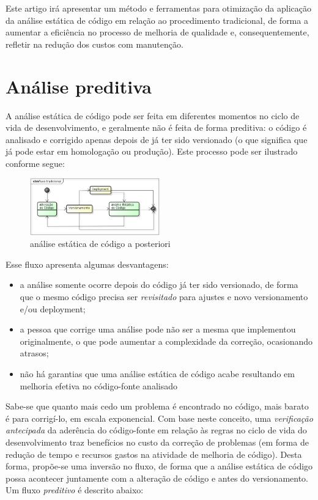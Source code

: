 \documentclass[12pt,journal,compsoc]{IEEEtran}
\begin{document}
Este artigo irá apresentar um método e ferramentas para otimização da aplicação da análise estática de código em relação ao procedimento tradicional, de forma a aumentar a eficiência no processo de melhoria de qualidade e, consequentemente, refletir na redução dos custos com manutenção.


\section{Análise preditiva}

A análise estática de código pode ser feita em diferentes momentos no ciclo de vida de desenvolvimento, e geralmente não é feita de forma preditiva: o código é analisado e corrigido apenas depois de já ter sido versionado (o que significa que já pode estar em homologação ou produção). Este processo pode ser ilustrado conforme segue:

\begin{figure}[ht!]
\centering
\includegraphics[width=0.5\textwidth]{img/flow_before}
\caption{análise estática de código a posteriori}
\label{flow_before}
\end{figure}

Esse fluxo apresenta algumas desvantagens:

\begin{itemize}
\item a análise somente ocorre depois do código já ter sido versionado, de forma que o mesmo código precisa ser \emph{revisitado} para ajustes e novo versionamento e/ou deployment; 
\item a pessoa que corrige uma análise pode não ser a mesma que implementou originalmente, o que pode aumentar a complexidade da correção, ocasionando atrasos;
\item não há garantias que uma análise estática de código acabe resultando em melhoria efetiva no código-fonte analisado  
\end{itemize}

Sabe-se que quanto mais cedo um problema é encontrado no código, mais barato é para corrigí-lo, em escala exponencial\cite{software_engineering_economics}. Com base neste conceito, uma \emph{verificação antecipada} da aderência do código-fonte em relação às regras no ciclo de vida do desenvolvimento traz benefícios no custo da correção de problemas (em forma de redução de tempo e recursos gastos na atividade de melhoria de código). Desta forma, propõe-se uma inversão no fluxo, de forma que a análise estática de código possa acontecer juntamente com a alteração de código e antes do versionamento. Um fluxo \emph{preditivo} é descrito abaixo:
\end{document}
